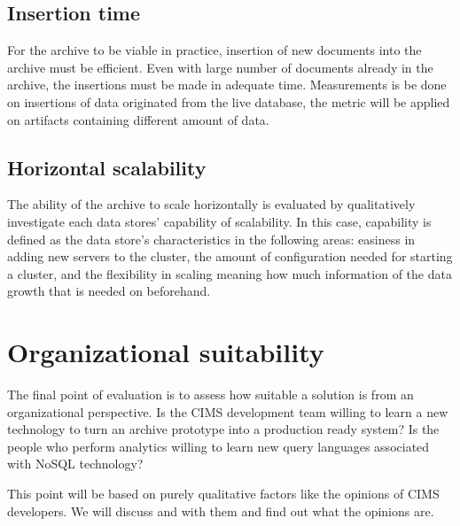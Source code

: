 \subsection{Insertion time}
For the archive to be viable in practice, insertion of new documents into the archive must be efficient. Even with large number of documents already in the archive, the insertions must be made in adequate time. Measurements is be done on insertions of data originated from the live database, the metric will be applied on artifacts containing different amount of data.

\subsection{Horizontal scalability}
The ability of the archive to scale horizontally is evaluated by qualitatively investigate each data stores' capability of scalability. In this case, capability is defined as the data store's characteristics in the following areas: easiness in adding new servers to the cluster, the amount of configuration needed for starting a cluster, and the flexibility in scaling meaning how much information of the data growth that is needed on beforehand.  

\section{Organizational suitability}
The final point of evaluation is to assess how suitable a solution is from an organizational perspective. Is the CIMS development team willing to learn a new technology to turn an archive prototype into a production ready system? Is the people who perform analytics willing to learn new query languages associated with NoSQL technology?

This point will be based on purely qualitative factors like the opinions of CIMS developers. We will discuss and with them and find out what the opinions are.